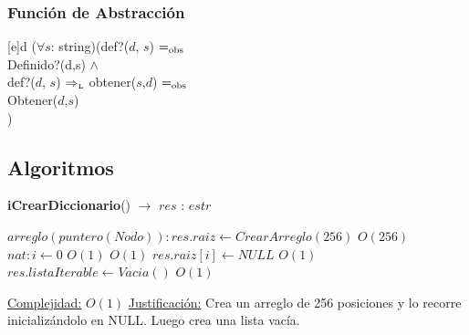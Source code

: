 
\pagebreak

\subsubsection{Funci\'on de Abstracci\'on}

[e]{d}{
($\forall s$: string)(def?($d$, $s$) $=_{\mathrm{obs}}$ \\ Definido?(d,s)
\- $\land$ \\
\- def?($d$, $s$) $\Rightarrow_{\mathrm{\scriptscriptstyle{L}}}$ obtener($s$,$d$) $=_{\mathrm{obs}}$ \\
\- Obtener($d$,$s$) \\
)
}

\subsection{Algoritmos}

\lstset{style=alg}


\begin{algorithm}[H]{\textbf{iCrearDiccionario}() $\to$ $res$ : $estr$}
	\begin{algorithmic}
		\State $arreglo(puntero(Nodo)): res.raiz \gets CrearArreglo(256)$ \Comment $O(256)$		 		\State $nat: i \gets 0$ \Comment $O(1)$			 
		 \Comment $O(1)$
		 	\State $res.raiz[i] \gets NULL$ \Comment $O(1)$
		\EndWhile
		\State $res.listaIterable \gets Vacia()$ \Comment $O(1)$

		\medskip
		\Statex \underline{Complejidad:} $O(1)$
		\Statex \underline{Justificación:} Crea un arreglo de 256 posiciones y lo recorre inicializándolo en NULL. Luego crea una lista vacía.

    \end{algorithmic}
\end{algorithm}


